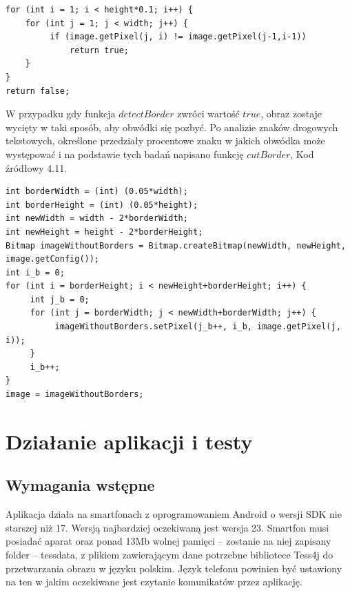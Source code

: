 \documentclass[eng,oneside]{mgr}
\begin{document}
\begin{lstlisting}[caption={Kod programu, odpowiadający za sprawdzenie czy wykryty prostokąt otoczony jest obwódką w innym kolorze.}]
for (int i = 1; i < height*0.1; i++) {
    for (int j = 1; j < width; j++) {
         if (image.getPixel(j, i) != image.getPixel(j-1,i-1))
             return true;
    }
}
return false;
\end{lstlisting}
\par W przypadku gdy funkcja $detectBorder$ zwróci wartość $true$, obraz zostaje wycięty w taki sposób, aby obwódki się pozbyć. Po analizie znaków drogowych tekstowych, określone przedziały procentowe znaku w jakich obwódka może występować i na podstawie tych badań napisano funkcję $cutBorder$, Kod źródłowy 4.11.
\begin{lstlisting}[caption={Kod programu, odpowiadający za obcięcie obrazu o konkretną procentową wartość.}]
int borderWidth = (int) (0.05*width);
int borderHeight = (int) (0.05*height);
int newWidth = width - 2*borderWidth;
int newHeight = height - 2*borderHeight;
Bitmap imageWithoutBorders = Bitmap.createBitmap(newWidth, newHeight, image.getConfig());
int i_b = 0;
for (int i = borderHeight; i < newHeight+borderHeight; i++) {
     int j_b = 0;
     for (int j = borderWidth; j < newWidth+borderWidth; j++) {
          imageWithoutBorders.setPixel(j_b++, i_b, image.getPixel(j, i));
     }
     i_b++;
}
image = imageWithoutBorders;
\end{lstlisting}
\chapter{Działanie aplikacji i testy}
\section {Wymagania wstępne}
Aplikacja działa na smartfonach z oprogramowaniem Android o wersji SDK nie starszej niż 17. Wersją najbardziej oczekiwaną jest wersja 23. Smartfon musi posiadać aparat oraz ponad 13Mb wolnej pamięci – zostanie na niej zapisany folder – tessdata, z plikiem zawierającym dane potrzebne bibliotece Tess4j do przetwarzania obrazu w języku polskim. Język telefonu powinien być ustawiony na ten w jakim oczekiwane jest czytanie komunikatów przez aplikację. 
\end{document}

